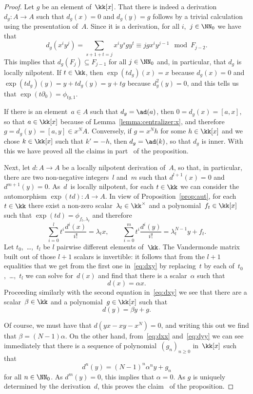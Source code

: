\begin{proof}
Let $g$ be an element of~$\kk[x]$. That there is
indeed a derivation~$d_g:A\to A$ such that $d_g(x)=0$ and $d_g(y)=g$
follows by a trivial calculation using the presentation of~$A$. Since it is
a derivation, for all $i$,~$j\in\NN_0$ we have that
  \[
  d_g(x^iy^j) 
        = \sum_{s+1+t=j}x^iy^sgy^t
        \equiv jgx^{i}y^{j-1} \mod F_{j-2}.
  \]
This implies that $d_g(F_j)\subseteq F_{j-1}$ for all $j\in\NN_0$ and, in
particular, that $d_g$ is locally nilpotent. If $t\in\kk$, then
$\exp(td_g)(x)=x$ because $d_g(x)=0$ and $\exp (td_g)(y)=y+td_g(y)=y+tg$
because $d_g^2(y)=0$, and this tells us that
$\exp(t\partial_0)=\phi_{tg,1}$.

If there is an element~$a\in A$ such that $d_g=\ad(a)$, then
$0=d_g(x)=[a,x]$, so that $a\in\kk[x]$ because of
Lemma~\ref{lemma:centralizer:x}, and therefore $g=d_g(y)=[a,y]\in x^NA$.
Conversely, if $g=x^Nh$ for some $h\in\kk[x]$ and we chose $k\in\kk[x]$
such that $k'=-h$, then $d_g=\ad(k)$, so that $d_g$ is inner. With
this we have proved all the claims in part~ of the proposition.

Next, let $d:A\to A$ be a locally nilpotent derivation of~$A$, so that, in
particular, there are two non-negative integers~$l$ and~$m$ such that
$d^{l+1}(x)=0$ and $d^{m+1}(y)=0$. As~$d$~is locally nilpotent, for each
$t\in\kk$ we can consider the automorphism $\exp(td):A\to A$. In view of
Proposition~\ref{prop:aut}, for each $t\in\kk$ there exist a non-zero
scalar~$\lambda_t\in\kk^\times$ and a polynomial~$f_t\in\kk[x]$ such that
$\exp(td)=\phi_{f_t,\lambda_t}$ and therefore
  \[ \label{eq:dxy}
  \sum_{i=0}^lt^i\frac{d^i(x)}{i!} = \lambda_t x, 
  \qquad
  \sum_{i=0}^mt^i\frac{d^i(y)}{i!} = \lambda_t^{N-1}y + f_t. 
  \]
Let $t_0$,~\dots,~$t_l$ be $l$ pairwise different elements of~$\kk$. The
Vandermonde matrix built out of those $l+1$ scalars is invertible: it
follows that from the $l+1$ equalities that we get from the first
one in~\eqref{eq:dxy} by replacing~$t$ by each of~$t_0$,~\dots,~$t_l$ we
can solve for~$d(x)$ and find that there is a scalar~$\alpha$ such that
  \[ \label{eq:dxx}
  d(x)=\alpha x.
  \]
Proceeding similarly with the second equation in~\eqref{eq:dxy} we see that
there are a scalar~$\beta\in\kk$ and a polynomial~$g\in\kk[x]$ such that 
  \[ \label{eq:dyy}
  d(y)=\beta y+g.
  \]

Of course, we must have that $d(yx-xy-x^N)=0$, and writing this out we find
that $\beta=(N-1)\alpha$. On the other hand, from~\eqref{eq:dxx}
and~\eqref{eq:dyy} we can see immediately that there is a sequence of
polynomial~$(g_n)_{n\geq0}$ in~$\kk[x]$ such that
  \[
  d^n(y) = (N-1)^n\alpha^n y + g_n
  \]
for all $n\in\NN_0$. As $d^m(y)=0$, this implies that $\alpha=0$. As $g$ is
uniquely determined by the derivation~$d$, this proves the
claim~ of the proposition.
\end{proof}

